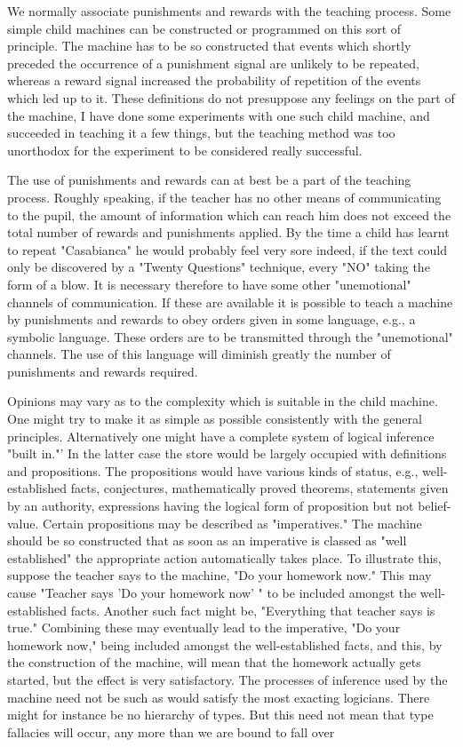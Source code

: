 \documentclass{article}
\begin{document}
We normally associate punishments and rewards with the teaching process. Some simple child machines can be constructed or programmed on this sort of principle. The machine has to be so constructed that events which shortly preceded the occurrence of a punishment signal are unlikely to be repeated, whereas a reward signal increased the probability of repetition of the events which led up to it. These definitions do not presuppose any feelings on the part of the machine, I have done some experiments with one such child machine, and succeeded in teaching it a few things, but the teaching method was too unorthodox for the experiment to be considered really successful.

The use of punishments and rewards can at best be a part of the teaching process. Roughly speaking, if the teacher has no other means of communicating to the pupil, the amount of information which can reach him does not exceed the total number of rewards and punishments applied. By the time a child has learnt to repeat "Casabianca" he would probably feel very sore indeed, if the text could only be discovered by a "Twenty Questions" technique, every "NO" taking the form of a blow. It is necessary therefore to have some other "unemotional" channels of communication. If these are available it is possible to teach a machine by punishments and rewards to obey orders given in some language, e.g., a symbolic language. These orders are to be transmitted through the "unemotional" channels. The use of this language will diminish greatly the number of punishments and rewards required.

Opinions may vary as to the complexity which is suitable in the child machine. One might try to make it as simple as possible consistently with the general principles. Alternatively one might have a complete system of logical inference "built in."' In the latter case the store would be largely occupied with definitions and propositions. The propositions would have various kinds of status, e.g., well-established facts, conjectures, mathematically proved theorems, statements given by an authority, expressions having the logical form of proposition but not belief-value. Certain propositions may be described as "imperatives." The machine should be so constructed that as soon as an imperative is classed as "well established" the appropriate action automatically takes place. To illustrate this, suppose the teacher says to the machine, "Do your homework now." This may cause "Teacher says 'Do your homework now' " to be included amongst the well-established facts. Another such fact might be, "Everything that teacher says is true." Combining these may eventually lead to the imperative, "Do your homework now," being included amongst the well-established facts, and this, by the construction of the machine, will mean that the homework actually gets started, but the effect is very satisfactory. The processes of inference used by the machine need not be such as would satisfy the most exacting logicians. There might for instance be no hierarchy of types. But this need not mean that type fallacies will occur, any more than we are bound to fall over
\end{document}
